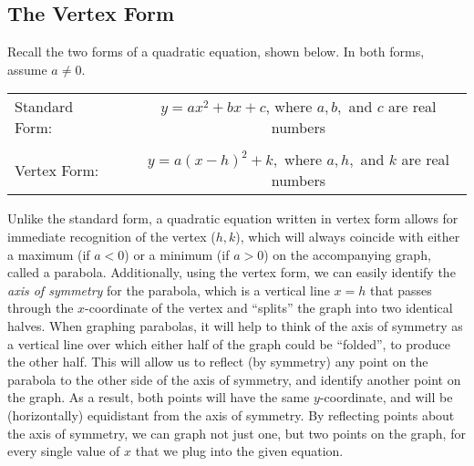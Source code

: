 \subsection{The Vertex Form}\pp


{}\pp

Recall the two forms of a quadratic equation, shown below.  In both forms, assume $a\neq 0$.%
\begin{center}
\begin{tabular}{lcc}
Standard Form: & & $y=ax^2+bx+c$, where $a,b,$ and $c$ are real numbers\\
&&\\
Vertex Form: & & $y=a(x-h)^2+k,$ where $a,h,$ and $k$ are real numbers
\end{tabular}
\end{center}
Unlike the standard form, a quadratic equation written in vertex form allows for immediate recognition of the vertex ($h,k$), which will always coincide with either a maximum (if $a<0$) or a minimum (if $a>0$) on the accompanying graph, called a parabola. Additionally, using the vertex form, we can easily identify the \textit{axis of symmetry} for the parabola, which is a vertical line $x=h$ that passes through the $x$-coordinate of the vertex and ``splits'' the graph into two identical halves.\pp
When graphing parabolas, it will help to think of the axis of symmetry as a vertical line over which either half of the graph could be ``folded'', to produce the other half.  This will allow us to reflect (by symmetry) any point on the parabola to the other side of the axis of symmetry, and identify another point on the graph.  As a result, both points will have the same $y$-coordinate, and will be (horizontally) equidistant from the axis of symmetry.  By reflecting points about the axis of symmetry, we can graph not just one, but two points on the graph, for every single value of $x$ that we plug into the given equation.  %

